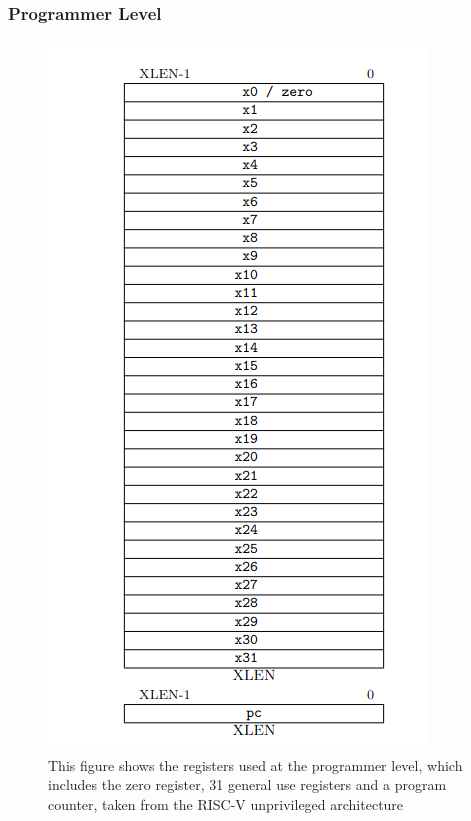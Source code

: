 \subsubsection{Programmer Level}
\begin{figure}
    \includegraphics[height=0.6\textheight]{figures/regs.png}
    \centering
    \caption[RISC-V Registers]{This figure shows the registers used at the programmer level, which includes the zero register, 31 general use registers and a program counter, taken from the RISC-V unprivileged architecture\cite{riscv_unpriv}}
    \label{fig:registers}
\end{figure}
